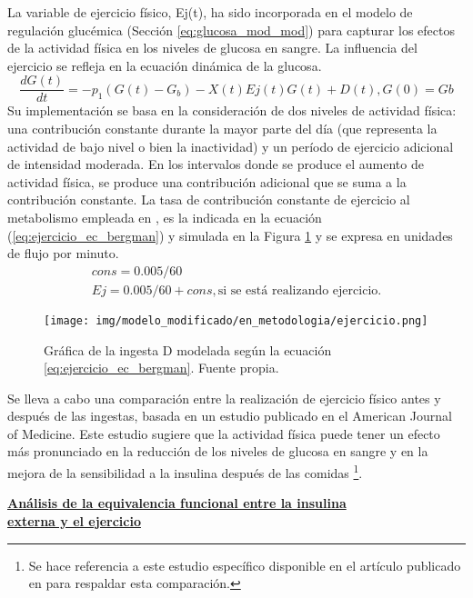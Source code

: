 La variable de ejercicio físico, Ej(t), ha sido incorporada en el modelo de regulación glucémica (Sección \ref{eq:glucosa_mod_mod}) para capturar los efectos de la actividad física en los niveles de glucosa en sangre. La influencia del ejercicio se refleja en la ecuación dinámica de la glucosa.  
\begin{equation} \label{eq:ejercicio_bergman}
\frac{dG(t)}{dt}= -p_1 (G(t) - G_b) - X(t)Ej(t)G(t)+D(t), G(0)=Gb 
\end{equation}
Su implementación se basa en la consideración de dos niveles de actividad física: una contribución constante durante la mayor parte del día (que representa la actividad de bajo nivel o bien la inactividad) y un período de ejercicio adicional de intensidad moderada. En los intervalos donde se produce el aumento de actividad física, se produce una contribución adicional que se suma a la contribución constante. 
La tasa de contribución constante de ejercicio al metabolismo empleada en \cite{tarin2021modelo}, es la indicada en la ecuación (\ref{eq:ejercicio_ec_bergman}) y simulada en la Figura \ref{fig:grafica_ejercicio} y se expresa en unidades de flujo por minuto. 
\begin{align} \label{eq:ejercicio_ec_bergman}
cons = 0.005/60 \\
Ej = 0.005/60 + cons,\text{si se está realizando ejercicio.}
\end{align}

\begin{figure}[htbp]
    \centering
    \texttt{[image: img/modelo\_modificado/en\_metodologia/ejercicio.png]}
    \caption{Gráfica de la ingesta D modelada según la ecuación \ref{eq:ejercicio_ec_bergman}. Fuente propia.}
    \label{fig:grafica_ejercicio}
\end{figure}

Se lleva a cabo una comparación entre la realización de ejercicio físico antes y después de las ingestas, basada en un estudio publicado en el American Journal of Medicine. Este estudio sugiere que la actividad física puede tener un efecto más pronunciado en la reducción de los niveles de glucosa en sangre y en la mejora de la sensibilidad a la insulina después de las comidas \footnote{Se hace referencia a este estudio específico disponible en el artículo publicado en  \cite{gwhospital_exercise_diabetes} para respaldar esta comparación.}.


\textbf{\underline{Análisis de la equivalencia funcional entre la insulina }} \\
\textbf{\underline{externa y el ejercicio}}

